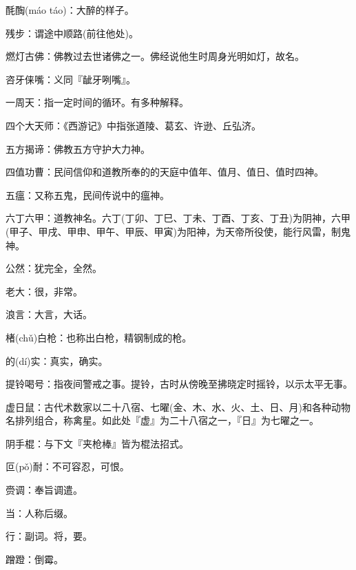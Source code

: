 \startbuffer[243]
酕醄(máo táo)：大醉的样子。
\stopbuffer


\startbuffer[244]
残步：谓途中顺路(前往他处)。
\stopbuffer


\startbuffer[245]
燃灯古佛：佛教过去世诸佛之一。佛经说他生时周身光明如灯，故名。
\stopbuffer


\startbuffer[246]
咨牙俫嘴：义同『龇牙咧嘴』。
\stopbuffer


\startbuffer[247]
一周天：指一定时间的循环。有多种解释。
\stopbuffer


\startbuffer[248]
四个大天师：《西游记》中指张道陵、葛玄、许逊、丘弘济。
\stopbuffer


\startbuffer[249]
五方揭谛：佛教五方守护大力神。
\stopbuffer


\startbuffer[250]
四值功曹：民间信仰和道教所奉的的天庭中值年、值月、值日、值时四神。
\stopbuffer


\startbuffer[251]
五瘟：又称五鬼，民间传说中的瘟神。
\stopbuffer


\startbuffer[252]
六丁六甲：道教神名。六丁(丁卯、丁巳、丁未、丁酉、丁亥、丁丑)为阴神，六甲(甲子、甲戌、甲申、甲午、甲辰、甲寅)为阳神，为天帝所役使，能行风雷，制鬼神。
\stopbuffer


\startbuffer[253]
公然：犹完全，全然。
\stopbuffer


\startbuffer[254]
老大：很，非常。
\stopbuffer


\startbuffer[255]
浪言：大言，大话。
\stopbuffer


\startbuffer[256]
楮(chǔ)白枪：也称出白枪，精钢制成的枪。
\stopbuffer


\startbuffer[257]
的(dí)实：真实，确实。
\stopbuffer


\startbuffer[258]
提铃喝号：指夜间警戒之事。提铃，古时从傍晚至拂晓定时摇铃，以示太平无事。
\stopbuffer


\startbuffer[259]
虚日鼠：古代术数家以二十八宿、七曜(金、木、水、火、土、日、月)和各种动物名排列组合，称禽星。如此处『虚』为二十八宿之一，『日』为七曜之一。
\stopbuffer


\startbuffer[260]
阴手棍：与下文『夹枪棒』皆为棍法招式。
\stopbuffer


\startbuffer[261]
叵(pǒ)耐：不可容忍，可恨。
\stopbuffer


\startbuffer[262]
赍调：奉旨调遣。
\stopbuffer


\startbuffer[263]
当：人称后缀。
\stopbuffer


\startbuffer[264]
行：副词。将，要。
\stopbuffer


\startbuffer[265]
蹭蹬：倒霉。
\stopbuffer


